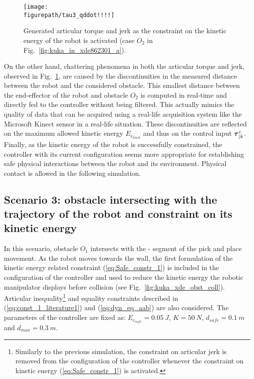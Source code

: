 \begin{figure}[!htbp]
\centering
{\texttt{[image: \\figurepath/tau3\_qddot!!!!]}}
\caption{Generated articular torque and jerk as the constraint on the kinetic energy of the robot is activated (case $O_2$ in Fig.~\ref{fig:kuka_in_xde862301_a}).} 
\label{fig:tau3_qddot!!!!}
\end{figure}
On the other hand, chattering phenomena in both the articular torque and jerk, observed in Fig.~\ref{fig:tau3_qddot!!!!}, are caused by the discontinuities in the measured distance between the robot and the considered obstacle. This smallest distance between the end-effector of the robot and obstacle $O_2$ is computed in real-time and directly fed to the controller without being filtered. This actually mimics the quality of data that can be acquired using a real-life acquisition system like the Microsoft Kinect sensor in a real-life situation.
These discontinuities are reflected on the maximum allowed kinetic energy $E_{c_{limit}}$ and thus on the control input $\mbox{\boldmath${\tau}$}_{|k}^{c}$. \\
Finally, as the kinetic energy of the robot is successfully constrained, the controller with its current configuration seems more appropriate for establishing safe physical interactions between the  robot and its environment. Physical contact is allowed in the following simulation.
\subsection{Scenario 3: obstacle intersecting with the trajectory of the robot and constraint on its kinetic energy} \label{subsec_inter_constr_Ec_classic}
In this scenario, obstacle $O_1$ intersects with the - segment of the pick and place movement. As the robot moves towards the wall, the first formulation of the kinetic energy related constraint (\ref{eq:Safe_constr_1}) is included in the configuration of the controller and used to reduce the kinetic energy the robotic manipulator displays before collision (see Fig.~\ref{fig:kuka_xde_obst_coll}). Articular inequality\footnote{Similarly to the previous simulation, the constraint on articular jerk is removed from the configuration of the controller whenever the constraint on kinetic energy (\ref{eq:Safe_constr_1}) is activated.} and equality constraints described in (\ref{eq:const_1_literature1}) and (\ref{eq:dyn_eq_aab}) are also considered. The parameters of the controller are fixed as: $E_{c_{safe}} = 0.05~J$, $K = 50~N$, $d_{safe} = 0.1~m$ and $d_{max} = 0.3~m$. 

